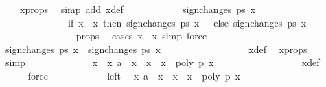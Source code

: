 \begin{isabellebody}
\ {\isacharbackquoteopen}{\isasymepsilon}\ {\isachargreater}\ {}{\isacharbackquoteclose}\ x{\isacharunderscore}props\ \isamarkupfalse%
\ {\isacharparenleft}simp\ add{\isacharcolon}\ x{\isacharprime}{\isacharunderscore}def{\isacharparenright}\isanewline
\ \ \ \ \ \ \ \ \ \ \isamarkupfalse%
\ {\isachardoublequoteopen}sign{\isacharunderscore}changes\ ps\ x{\isacharprime}\ {\isacharequal}\ \isanewline
\ \ \ \ \ \ \ \ \ \ \ \ \ \ {\isacharparenleft}if\ x{\isacharprime}\ {\isacharless}\ x\ then\ sign{\isacharunderscore}changes\ ps\ x\ {\isacharplus}\ {}\ else\ sign{\isacharunderscore}changes\ ps\ x{\isacharparenright}{\isachardoublequoteclose}\isanewline
\ \ \ \ \ \ \ \ \ \ \ \ \ \ \isamarkupfalse%
\ {\isasymepsilon}{\isacharunderscore}props{\isacharparenleft}{}{\isacharparenright}\ \isamarkupfalse%
\ {\isacharparenleft}cases\ {\isachardoublequoteopen}x{\isacharprime}\ {\isacharequal}\ x{\isachardoublequoteclose}{\isacharcomma}\ simp{\isacharcomma}\ force{\isacharparenright}\isanewline
\ \ \ \ \ \ \ \ \ \ \isamarkupfalse%
\ {\isachardoublequoteopen}sign{\isacharunderscore}changes\ ps\ x{\isacharprime}\ {\isacharminus}\ sign{\isacharunderscore}changes\ ps\ x\ {\isacharequal}\ {}{\isachardoublequoteclose}\isanewline
\ \ \ \ \ \ \ \ \ \ \ \ \ \ \isamarkupfalse%
\ x{\isacharprime}{\isacharunderscore}def\ \isamarkupfalse%
\ x{\isacharunderscore}props\ {\isacharbackquoteopen}{\isasymepsilon}\ {\isachargreater}\ {}{\isacharbackquoteclose}\ \isamarkupfalse%
\ simp\isanewline
\isanewline
\ \ \ \ \ \ \ \ \ \ \isamarkupfalse%
\ \isamarkupfalse%
\ {\isachardoublequoteopen}x\ {\isasymnotin}\ {\isacharbraceleft}x{\isacharprime}{\isacharprime}{\isachardot}\ a\ {\isacharless}\ x{\isacharprime}{\isacharprime}\ {\isasymand}\ x{\isacharprime}{\isacharprime}\ {\isasymle}\ x{\isacharprime}\ {\isasymand}\ poly\ p\ x{\isacharprime}{\isacharprime}\ {\isacharequal}\ {}{\isacharbraceright}{\isachardoublequoteclose}\isanewline
\ \ \ \ \ \ \ \ \ \ \ \ \ \ \isamarkupfalse%
\ x{\isacharprime}{\isacharunderscore}def\ \isamarkupfalse%
\ {\isacharbackquoteopen}{\isasymepsilon}\ {\isachargreater}\ {}{\isacharbackquoteclose}\ \isamarkupfalse%
\ force\isanewline
\ \ \ \ \ \ \ \ \ \ \isamarkupfalse%
\ left\ \isamarkupfalse%
\ {\isachardoublequoteopen}{\isacharbraceleft}x{\isacharprime}{\isacharprime}{\isachardot}\ a\ {\isacharless}\ x{\isacharprime}{\isacharprime}\ {\isasymand}\ x{\isacharprime}{\isacharprime}\ {\isasymle}\ x{\isacharprime}\ {\isasymand}\ poly\ p\ x{\isacharprime}{\isacharprime}\ {\isacharequal}\ {}{\isacharbraceright}\ {\isacharequal}\ {\isacharbraceleft}{\isacharbraceright}{\isachardoublequoteclose}\isanewline

\end{isabellebody}
